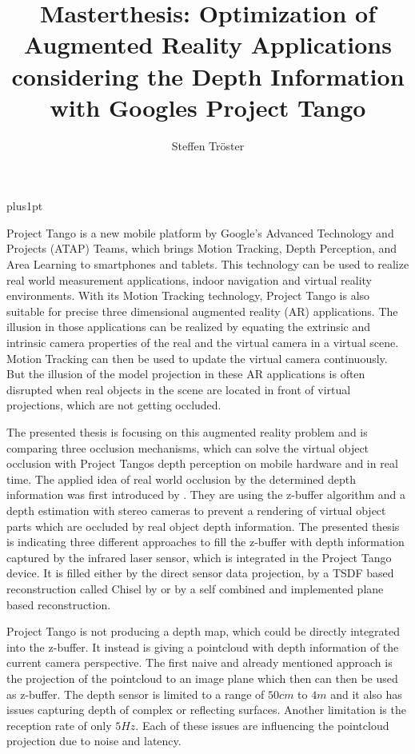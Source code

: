 \documentclass[12pt]{support/thcolognereport}
\title{Masterthesis: Optimization of Augmented Reality Applications considering the Depth Information with Googles Project Tango}
\author{Steffen Tröster}
\begin{document}
\baselineskip=18pt plus1pt

\maketitle 

\setlength{\parskip}{1em}

Project Tango is a new mobile platform by Google’s Advanced Technology and Projects (ATAP) Teams, which brings Motion Tracking, Depth Perception, and Area Learning to smartphones and tablets. This technology can be used to realize real world measurement applications, indoor navigation and virtual reality environments.  With its Motion Tracking technology, Project Tango is also suitable for precise three dimensional augmented reality (AR) applications. The illusion in those applications can be realized by equating the extrinsic and intrinsic camera properties of the real and the virtual camera in a virtual scene. Motion Tracking can then be used to update the virtual camera continuously. But the illusion of the model projection in these AR applications is often disrupted when real objects in the scene are located in front of virtual projections, which are not getting occluded.

The presented thesis is focusing on this augmented reality problem and is comparing three occlusion mechanisms, which can solve the virtual object occlusion with Project Tangos depth perception on mobile hardware and in real time. The applied idea of real world occlusion by the determined depth information was first introduced by \citet{wloka1995resolving}. They are using the z-buffer algorithm and a depth estimation with stereo cameras to prevent a rendering of virtual object parts which are occluded by real object depth information. The presented thesis is indicating three different approaches to fill the z-buffer with depth information captured by the infrared laser sensor, which is integrated in the Project Tango device. It is filled either by the direct sensor data projection, by a TSDF based reconstruction called Chisel by \citet{Klingensmith_2015_7924} or by a self combined and implemented plane based reconstruction. 

Project Tango is not producing a depth map, which could be directly integrated into the z-buffer. It instead is giving a pointcloud with depth information of the current camera perspective. The first naive and already mentioned approach is the projection of the pointcloud to an image plane which then can then be used as z-buffer. The depth sensor is limited to a range of \(50cm\) to \(4m\) and it also has issues capturing depth of complex or reflecting surfaces. Another limitation is the reception rate of only \(5Hz\). Each of these issues are influencing the pointcloud projection due to noise and latency.
\end{document}
